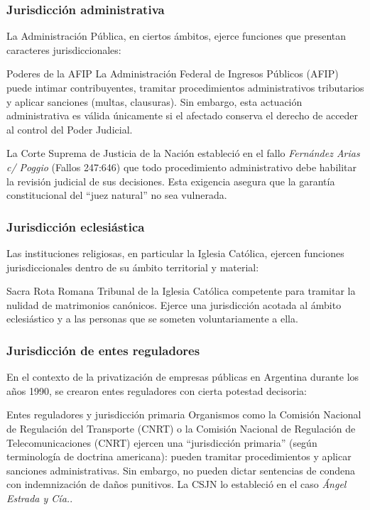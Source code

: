 \documentclass[12pt,oneside]{book}
\begin{document}
\subsubsection{Jurisdicción administrativa}

La Administración Pública, en ciertos ámbitos, ejerce funciones que presentan caracteres jurisdiccionales:

\begin{example}{Poderes de la AFIP}
La Administración Federal de Ingresos Públicos (AFIP) puede intimar contribuyentes, tramitar procedimientos administrativos tributarios y aplicar sanciones (multas, clausuras). Sin embargo, esta actuación administrativa es válida únicamente si el afectado conserva el derecho de acceder al control del Poder Judicial.
\end{example}

La Corte Suprema de Justicia de la Nación estableció en el fallo \textit{Fernández Arias c/ Poggio} (Fallos 247:646) que todo procedimiento administrativo debe habilitar la revisión judicial de sus decisiones. Esta exigencia asegura que la garantía constitucional del ``juez natural'' no sea vulnerada.

\subsubsection{Jurisdicción eclesiástica}

Las instituciones religiosas, en particular la Iglesia Católica, ejercen funciones jurisdiccionales dentro de su ámbito territorial y material:

\begin{definition}{Sacra Rota Romana}
Tribunal de la Iglesia Católica competente para tramitar la nulidad de matrimonios canónicos. Ejerce una jurisdicción acotada al ámbito eclesiástico y a las personas que se someten voluntariamente a ella.
\end{definition}

\subsubsection{Jurisdicción de entes reguladores}

En el contexto de la privatización de empresas públicas en Argentina durante los años 1990, se crearon entes reguladores con cierta potestad decisoria:

\begin{example}{Entes reguladores y jurisdicción primaria}
Organismos como la Comisión Nacional de Regulación del Transporte (CNRT) o la Comisión Nacional de Regulación de Telecomunicaciones (CNRT) ejercen una ``jurisdicción primaria'' (según terminología de doctrina americana): pueden tramitar procedimientos y aplicar sanciones administrativas. Sin embargo, no pueden dictar sentencias de condena con indemnización de daños punitivos. La CSJN lo estableció en el caso \textit{Ángel Estrada y Cía.}.
\end{example}
\end{document}
